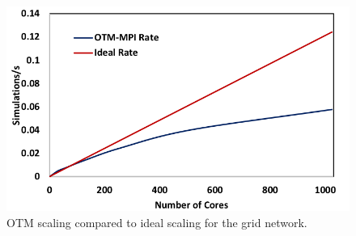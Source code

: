 \begin{figure}[!ht]
    \centering
    \includegraphics[width=\columnwidth]{figs/Scaling.png}
    \caption{OTM scaling  compared to ideal scaling for the grid network.}
    \label{fig:scaling}
\end{figure}

